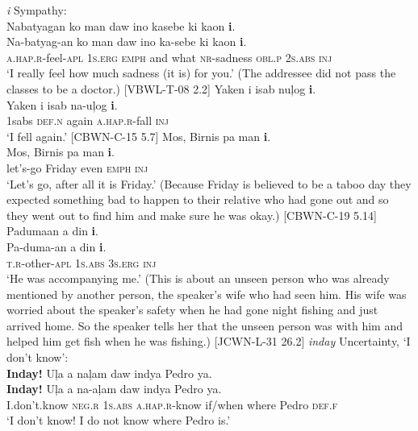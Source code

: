 \newpage

\ea
\textit{i} Sympathy: \\
Nabatyagan  ko  man  daw  ino  kasebe  ki  kaon  \textbf{i}. \\\smallskip
\gll Na-batyag-an  ko  man  daw  ino  ka-sebe  ki  kaon  \textbf{i}. \\
\textsc{a.hap.r}-feel-\textsc{apl}  1\textsc{s.erg}  \textsc{emph}  and  what  \textsc{nr}-sadness  \textsc{obl.p}  2\textsc{s.abs}  \textsc{inj} \\
\glt ‘I really feel how much sadness (it is) for you.’ (The addressee did not pass the classes to be a doctor.) [VBWL-T-08 2.2]
\z
\ea
Yaken  i  isab  nuļog  \textbf{i}. \\\smallskip
\gll Yaken  i  isab  na-uļog  \textbf{i}. \\
1sabs  \textsc{def.n} again  \textsc{a.hap.r}{}-fall  \textsc{inj} \\
\glt ‘I fell again.’  [CBWN-C-15 5.7]
\z
\ea
Mos,  Birnis  pa  man  \textbf{i}. \\\smallskip
\gll Mos,  Birnis  pa  man  \textbf{i}. \\
let’s-go  Friday  even  \textsc{emph}  \textsc{inj} \\
\glt ‘Let’s go, after all it is Friday.'  (Because Friday is believed to be a taboo day they expected something bad to happen to their relative who had gone out and so they went out to find him and make sure he was okay.) [CBWN-C-19 5.14]
\z
\ea
\label{bkm:Ref118731030}
Padumaan  a  din  \textbf{i}. \\\smallskip
\gll Pa-duma-an  a  din  \textbf{i}. \\
\textsc{t.r}-other-\textsc{apl}  1\textsc{s.abs}  3\textsc{s.erg}  \textsc{inj} \\
\glt ‘He was accompanying me.’ (This is about an unseen person who was already mentioned by another person, the speaker’s wife who had seen him.  His wife was worried about the speaker’s safety when he had gone night fishing and just arrived home. So the speaker tells her that the unseen person was with him and helped him get fish when he was fishing.) [JCWN-L-31 26.2]
\z
\ea
\label{bkm:Ref114565677}
\textit{inday} Uncertainty, ‘I don’t know’: \\
\textbf{Inday!}  Uļa  a  naļam  daw  indya  Pedro  ya. \\\smallskip
\gll \textbf{Inday!}  Uļa  a  na-aļam  daw  indya  Pedro  ya. \\
I.don’t.know  \textsc{neg.r}  1\textsc{s.abs}  \textsc{a.hap.r}-know  if/when  where  Pedro  \textsc{def.f} \\
\glt ‘I don’t know! I do not know where Pedro is.’
\z

